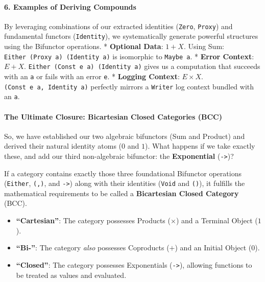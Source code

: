 \documentclass[
]{article}
\providecommand{\tightlist}{%
  \setlength{\itemsep}{0pt}\setlength{\parskip}{0pt}}
\begin{document}
\paragraph{6. Examples of Deriving
Compounds}\label{examples-of-deriving-compounds}

By leveraging combinations of our extracted identities (\texttt{Zero},
\texttt{Proxy}) and fundamental functors (\texttt{Identity}), we
systematically generate powerful structures using the Bifunctor
operations. * \textbf{Optional Data}: \(1 + X\). Using Sum:
\texttt{Either\ (Proxy\ a)\ (Identity\ a)} is isomorphic to
\texttt{Maybe\ a}. * \textbf{Error Context}: \(E + X\).
\texttt{Either\ (Const\ e\ a)\ (Identity\ a)} gives us a computation
that succeeds with an \texttt{a} or fails with an error \texttt{e}. *
\textbf{Logging Context}: \(E \times X\).
\texttt{(Const\ e\ a,\ Identity\ a)} perfectly mirrors a \texttt{Writer}
log context bundled with an \texttt{a}.

\paragraph{The Ultimate Closure: Bicartesian Closed Categories
(BCC)}\label{the-ultimate-closure-bicartesian-closed-categories-bcc}

So, we have established our two algebraic bifunctors (Sum and Product)
and derived their natural identity atoms (\(0\) and \(1\)). What happens
if we take exactly these, and add our third non-algebraic bifunctor: the
\textbf{Exponential} (\texttt{-\textgreater{}})?

If a category contains exactly those three foundational Bifunctor
operations (\texttt{Either}, \texttt{(,)}, and \texttt{-\textgreater{}})
along with their identities (\texttt{Void} and \texttt{()}), it fulfills
the mathematical requirements to be called a \textbf{Bicartesian Closed
Category} (BCC).

\begin{itemize}
\tightlist
\item
  \textbf{``Cartesian''}: The category possesses Products (\(\times\))
  and a Terminal Object (\(1\)).
\item
  \textbf{``Bi-''}: The category \emph{also} possesses Coproducts
  (\(+\)) and an Initial Object (\(0\)).
\item
  \textbf{``Closed''}: The category possesses Exponentials
  (\texttt{-\textgreater{}}), allowing functions to be treated as values
  and evaluated.
\end{itemize}
\end{document}
